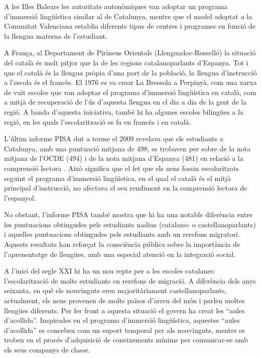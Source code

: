 \begin{multicols}{2}
A les Illes Balears les autoritats autonòmiques van adoptar un programa d’immersió lingüística similar al de Catalunya, mentre que el model adoptat a la Comunitat Valenciana establia diferents tipus de centres i programes en funció de la llengua materna de l’estudiant.

A França, al Departament de Pirineus Orientals (Llenguadoc-Rosselló) la situació del català és molt pitjor que la de les regions catalanoparlants d’Espanya. Tot i que el català és la llengua pròpia d’una part de la població, la llengua d’instrucció a l’escola és el francès. El 1976 es va crear La Bressola \cite{CAT-Nota6} a Perpinyà, com una xarxa de vuit escoles que van adoptar el programa d’immersió lingüística en català, com a mitjà de recuperació de l’ús d’aquesta llengua en el dia a dia de la gent de la regió. A banda d’aquesta iniciativa, també hi ha algunes escoles bilingües a la regió, en les quals l’escolarització es fa en francès i en català.

L’últim informe PISA dut a terme el 2009 revelava que els estudiants a Catalunya, amb una puntuació mitjana de 498, es trobaven per sobre de la nota mitjana de l’OCDE (494) i de la nota mitjana d’Espanya (481) en relació a la comprensió lectora \cite{CAT-Nota7}. Això significa que el fet que els nens fossin escolaritzats seguint el programa d’immersió lingüística, en el qual el català és el mitjà principal d’instrucció, no afectava el seu rendiment en la comprensió lectora de l’espanyol.

No obstant, l’informe PISA també mostra que hi ha una notable diferència entre les puntuacions obtingudes pels estudiants nadius (catalano- o castellanoparlants) i aquelles puntuacions obtingudes pels estudiants amb un rerefons migratori. Aquests resultats han reforçat la consciència pública sobre la importància de l’aprenentatge de llengües, amb una especial atenció en la integració social. 

A l’inici del segle XXI hi ha un nou repte per a les escoles catalanes: l’escolarització de molts estudiants en rerefons de migració. A diferència dels anys seixanta, en què els nouvinguts eren majoritàriament castellanoparlants, actualment, els nens provenen de molts països d’arreu del món i parlen moltes llengües diferents. Per fer front a aquesta situació el govern ha creat les “aules d’acollida”. Inspirades en el programa d’immersió lingüística, aquestes “aules d’acollida” es conceben com un suport temporal per als nouvinguts, mentre es troben en el procés d’adquisició de coneixements mínims per comunicar-se amb els seus companys de classe.


\end{multicols}
